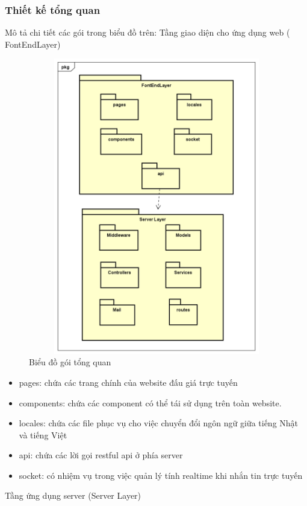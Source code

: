 \documentclass{article}
\begin{document}
\subsubsection{Thiết kế tổng quan}
Mô tả chi tiết các gói trong biểu đồ trên: 
Tầng giao diện cho ứng dụng web ( FontEndLayer)
\begin{figure}[H]
    \centering
    \includegraphics[width=11.4cm,height=12.92cm]{images/gói tổng quan.png}
    \caption{Biểu đồ gói tổng quan}
    \label{hinh43}
\end{figure}
\begin{itemize}
    \item pages: chứa các trang chính của website đấu giá trực tuyến
    \item components: chứa các component có thể tái sử dụng trên toàn website.
    \item locales: chứa các file phục vụ cho việc chuyển đổi ngôn ngữ giữa tiếng Nhật và tiếng Việt
    \item api: chứa các lời gọi restful api ở phía server
    \item socket: có nhiệm vụ trong việc quản lý tính realtime khi nhắn tin trực tuyến
\end{itemize}
Tầng ứng dụng server (Server Layer)
\end{document}
